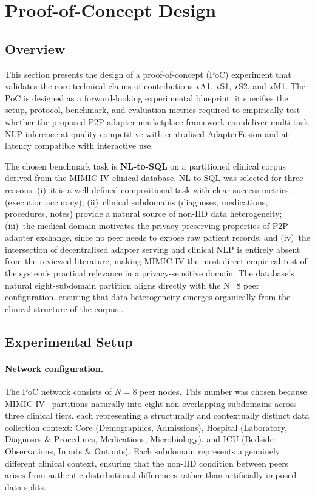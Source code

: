\section{Proof-of-Concept Design}
\label{sec:poc}

\subsection{Overview}
\label{sec:poc:overview}

This section presents the design of a proof-of-concept (PoC) experiment that validates
the core technical claims of contributions $\star$A1, $\star$S1, $\star$S2, and
$\star$M1. The PoC is designed as a forward-looking experimental blueprint: it specifies
the setup, protocol, benchmark, and evaluation metrics required to empirically test
whether the proposed P2P adapter marketplace framework can deliver multi-task NLP
inference at quality competitive with centralised AdapterFusion and at latency
compatible with interactive use.

The chosen benchmark task is \textbf{NL-to-SQL} on a partitioned clinical corpus
derived from the MIMIC-IV clinical database\cite{Johnson2023}. NL-to-SQL was selected for three reasons:
(i)~it is a well-defined compositional task with clear success metrics (execution
accuracy); (ii)~clinical subdomains (diagnoses, medications, procedures, notes) provide
a natural source of non-IID data heterogeneity; (iii)~the medical domain motivates
the privacy-preserving properties of P2P adapter exchange, since no peer needs to
expose raw patient records; and (iv)~the intersection of decentralised adapter serving and clinical NLP is entirely absent from the reviewed literature, making MIMIC-IV the most direct empirical test of the system's practical relevance in a privacy-sensitive domain. The database's natural eight-subdomain partition aligns directly with the N=8 peer configuration, ensuring that data heterogeneity emerges organically from the clinical structure of the corpus..

\subsection{Experimental Setup}
\label{sec:poc:setup}

\paragraph{Network configuration.}
The PoC network consists of $N = 8$ peer nodes. This number was chosen because 
MIMIC-IV~\citep{Johnson2023} partitions naturally into eight non-overlapping 
subdomains across three clinical tiers, each representing a structurally and 
contextually distinct data collection context: Core (Demographics, Admissions), 
Hospital (Laboratory, Diagnoses \& Procedures, Medications, Microbiology), and 
ICU (Bedside Observations, Inputs \& Outputs). Each subdomain represents a 
genuinely different clinical context, ensuring that the non-IID condition between 
peers arises from authentic distributional differences rather than artificially 
imposed data splits.

